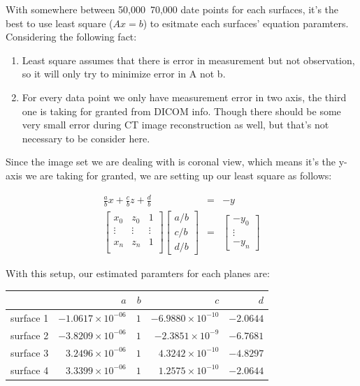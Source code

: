 With somewhere between 50,000~70,000 date points for each surfaces, it's the best to use least square ($Ax=b$) to 
esitmate each surfaces' equation paramters. Considering the following fact:
\begin{enumerate}
  \item Least square assumes that there is error in measurement but not observation, so it will only try to
    minimize error in A not b.
  \item For every data point we only have measurement error in two axis, the third one is taking for granted 
    from DICOM info. Though there should be some very small error during CT image reconstruction as well, but
    that's not necessary to be consider here.
\end{enumerate}
Since the image set we are dealing with is coronal view, which means it's the y-axis we are taking for granted,
we are setting up our least square as follows:

\begin{eqnarray}
\frac{a}{b}x + \frac{c}{b}z + \frac{d}{b} & = & -y \label{eq:x_orient}\\
\begin{bmatrix}
  x_0  & z_0 & 1 \\
  \vdots & \vdots & \vdots \\
  x_n & z_n & 1 \\
\end{bmatrix}
\begin{bmatrix}
a/b\\
c/b\\
d/b
\end{bmatrix}
& = &
\begin{bmatrix}
-y_0 \\
\vdots\\
-y_n
\end{bmatrix}
\end{eqnarray}

With this setup, our estimated paramters for each planes are:

\begin{tabular}{| l || r | r | r | r |}
            \hline
            &               $a$ & $b$ &               $c$ & $d$ \\
            \hline
  surface 1 & $-1.0617\times10^{-06}$ & $1$ & $-6.9880\times10^{-10}$ & $-2.0644$ \\ 
            \hline
  surface 2 & $-3.8209\times10^{-06}$ & $1$ & $-2.3851\times10^{-9}$  & $-6.7681$ \\ 
            \hline
  surface 3 & $3.2496\times10^{-06}$  & $1$ & $4.3242\times10^{-10}$  & $-4.8297$ \\ 
            \hline
  surface 4 & $3.3399\times10^{-06}$  & $1$ & $1.2575\times10^{-10}$  & $-2.0644$ \\ 
            \hline
\end{tabular}

